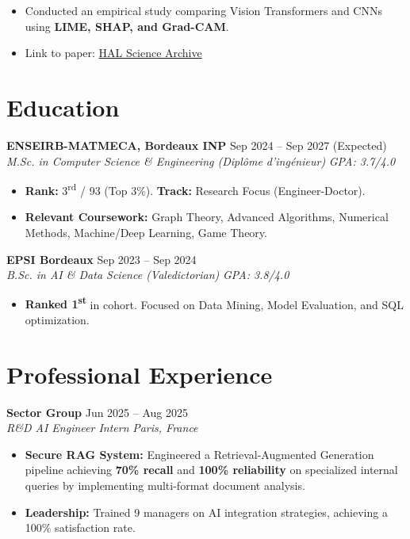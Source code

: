 \documentclass[10pt, letterpaper]{article}
\newcommand{\entry}[4]{
  \noindent \textbf{#1} \hfill #2 \\
  \textit{#3} \hfill \textit{#4} \par 
}
\begin{document}
\begin{itemize}
    \item Conducted an empirical study comparing Vision Transformers and CNNs using \textbf{LIME, SHAP, and Grad-CAM}.
    \item Link to paper: \href{https://hal.science/hal-04641791}{HAL Science Archive}
\end{itemize}

\section{Education}

\entry{ENSEIRB-MATMECA, Bordeaux INP}{Sep 2024 -- Sep 2027 (Expected)}{M.Sc. in Computer Science \& Engineering (Diplôme d'ingénieur)}{GPA: 3.7/4.0}
\begin{itemize}
    \item \textbf{Rank:} 3\textsuperscript{rd} / 93 (Top 3\%). \textbf{Track:} Research Focus (Engineer-Doctor).
    \item \textbf{Relevant Coursework:} Graph Theory, Advanced Algorithms, Numerical Methods, Machine/Deep Learning, Game Theory.
\end{itemize}

\vspace{6pt}

\entry{EPSI Bordeaux}{Sep 2023 -- Sep 2024}{B.Sc. in AI \& Data Science (Valedictorian)}{GPA: 3.8/4.0}
\begin{itemize}
    \item \textbf{Ranked 1\textsuperscript{st}} in cohort. Focused on Data Mining, Model Evaluation, and SQL optimization.
\end{itemize}

\section{Professional Experience}

\entry{Sector Group}{Jun 2025 -- Aug 2025}{R\&D AI Engineer Intern}{Paris, France}
\begin{itemize}
    \item \textbf{Secure RAG System:} Engineered a Retrieval-Augmented Generation pipeline achieving \textbf{70\% recall} and \textbf{100\% reliability} on specialized internal queries by implementing multi-format document analysis.
    \item \textbf{Leadership:} Trained 9 managers on AI integration strategies, achieving a 100\% satisfaction rate.
\end{itemize}
\end{document}
